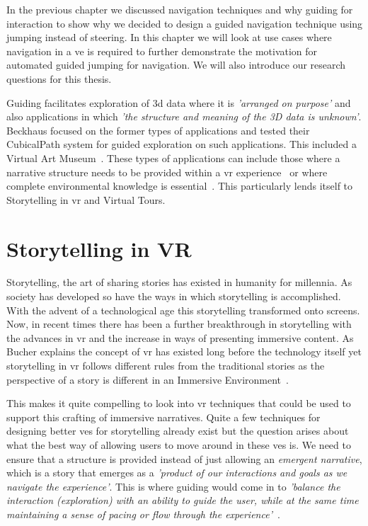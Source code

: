 \label{Chapter:Guided Jumping Motivation}
In the previous chapter we discussed navigation techniques and why guiding for interaction to show why we decided to design a guided navigation technique using jumping instead of steering. In this chapter we will look at use cases where navigation in a \acrshort{ve} is required to further demonstrate the motivation for automated guided jumping for navigation. We will also introduce our research questions for this thesis. 

Guiding facilitates exploration of \acrshort{3d} data where it is \textit{'arranged on purpose'} and also applications in which \textit{'the structure and meaning of the 3D data is unknown'}. Beckhaus focused on the former types of applications and tested their CubicalPath system for guided exploration on such applications. This included a Virtual Art Museum~\cite{Beckhaus2002}. These types of applications can include those where a narrative structure needs to be provided within a \acrshort{vr} experience~\cite{Galyean1995} or where complete environmental knowledge is essential~\cite{Freitag2018}. This particularly lends itself to Storytelling in \acrshort{vr} and Virtual Tours. 

\section{Storytelling in VR}
\label{section:GJM Storytelling in VR}
Storytelling, the art of sharing stories has existed in humanity for millennia. As society has developed so have the ways in which storytelling is accomplished. With the advent of a technological age this storytelling transformed onto screens. Now, in recent times there has been a further breakthrough in storytelling with the advances in \acrshort{vr} and the increase in ways of presenting immersive content. As Bucher explains the concept of \acrshort{vr} has existed long before the technology itself yet storytelling in \acrshort{vr} follows different rules from the traditional stories as the perspective of a story is different in an Immersive Environment~\cite{Bucher2017}.

This makes it quite compelling to look into \acrshort{vr} techniques that could be used to support this crafting of immersive narratives. Quite a few techniques for designing better \acrshort{ve}s for storytelling already exist but the question arises about what the best way of allowing users to move around in these \acrshort{ve}s is. We need to ensure that a structure is provided instead of just allowing an \textit{emergent narrative}, which is a story that emerges as a \textit{'product of our interactions and goals as we navigate the experience'}. This is where guiding would come in to \textit{'balance the interaction (exploration) with an ability to guide the user, while at the same time maintaining a sense of pacing or flow through the experience'}~\cite{Galyean1995}.

